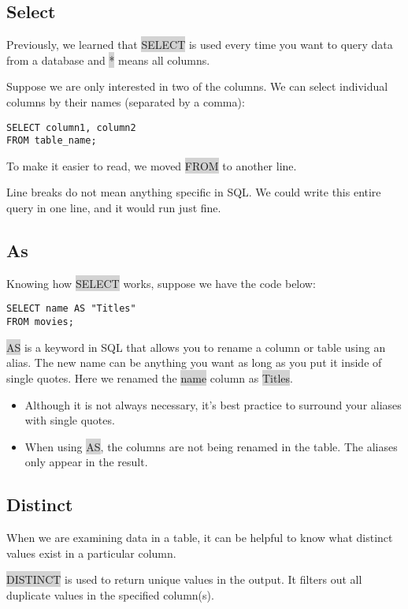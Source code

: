 \documentclass[11pt]{article}
\begin{document}
\subsection{Select}
Previously, we learned that \colorbox{lightgray}{SELECT} is used every time you want to query data from a database and \colorbox{lightgray}{*} means all columns.

Suppose we are only interested in two of the columns. We can select individual columns by their names (separated by a comma):
\begin{lstlisting}
SELECT column1, column2 
FROM table_name;
\end{lstlisting}
To make it easier to read, we moved \colorbox{lightgray}{FROM} to another line.

Line breaks do not mean anything specific in SQL. We could write this entire query in one line, and it would run just fine.

\subsection{As}
Knowing how \colorbox{lightgray}{SELECT} works, suppose we have the code below:
\begin{lstlisting}
SELECT name AS "Titles"
FROM movies;
\end{lstlisting}

\colorbox{lightgray}{AS} is a keyword in SQL that allows you to rename a column or table using an alias. The new name can be anything you want as long as you put it inside of single quotes. Here we renamed the \colorbox{lightgray}{name} column as \colorbox{lightgray}{Titles}.
\begin{itemize}
\item Although it is not always necessary, it’s best practice to surround your aliases with single quotes.
\item When using \colorbox{lightgray}{AS}, the columns are not being renamed in the table. The aliases only appear in the result.
\end{itemize}

\subsection{Distinct}
When we are examining data in a table, it can be helpful to know what distinct values exist in a particular column.

\colorbox{lightgray}{DISTINCT} is used to return unique values in the output. It filters out all duplicate values in the specified column(s).
\end{document}
